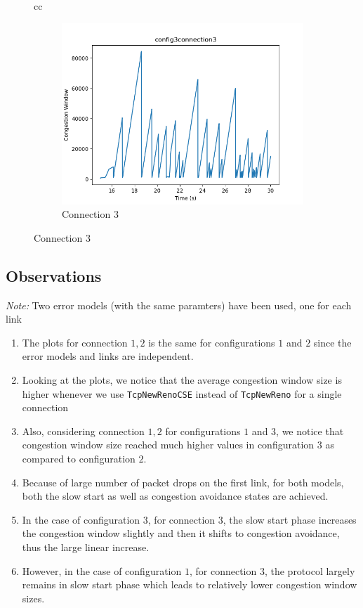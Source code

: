 \documentclass[11pt]{article}
\begin{document}
\begin{figure}[H]
\begin{tabular}[c]{cc}
      {\begin{subfigure}[c]{0.5\textwidth}
        \centering
        \includegraphics[width=\textwidth]{Q3/outputs/config3connection3.png}
        \caption{Connection 3}
      \end{subfigure}}
  \end{tabular}
\end{figure}

\subsection{Observations}
\textit{Note:} Two error models (with the same paramters) have been used, one for each link
\begin{enumerate}
    \item The plots for connection $1, 2$ is the same for configurations $1$ and $2$ since the error models and links are independent.
    \item Looking at the plots, we notice that the average congestion window size is higher whenever we use \texttt{TcpNewRenoCSE} instead of \texttt{TcpNewReno} for a single connection
    \item Also, considering connection $1, 2$ for configurations $1$ and $3$, we notice that congestion window size reached much higher values in configuration $3$ as compared to configuration $2$.
    \item Because of large number of packet drops on the first link, for both models, both the slow start as well as congestion avoidance states are achieved.
    \item In the case of configuration $3$, for connection $3$, the slow start phase increases the congestion window slightly and then it shifts to congestion avoidance, thus the large linear increase.
    \item However, in the case of configuration $1$, for connection $3$, the protocol largely remains in slow start phase which leads to relatively lower congestion window sizes.
\end{enumerate}
\end{document}
